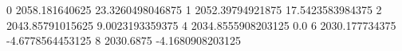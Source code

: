 0 2058.181640625 23.3260498046875
1 2052.39794921875 17.5423583984375
2 2043.85791015625 9.0023193359375
4 2034.8555908203125 0.0
6 2030.177734375 -4.6778564453125
8 2030.6875 -4.1680908203125
